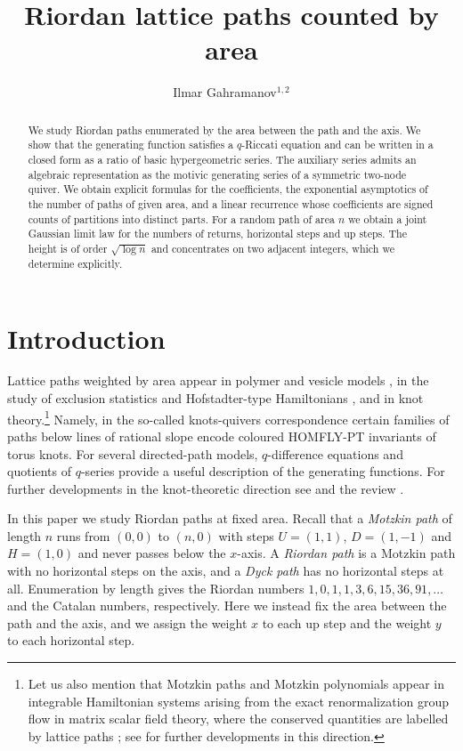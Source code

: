 \documentclass[11pt,reqno]{amsart}
\title[Riordan lattice paths counted by area]{Riordan lattice paths counted by area}
\author[Ilmar Gahramanov]{Ilmar Gahramanov$^{1,2}$}
\numberwithin{equation}{section}
\theoremstyle{remark}
\begin{document}
\begin{abstract}
We study Riordan paths enumerated by the area between the path and the axis. We show that the generating
function satisfies a $q$-Riccati equation and can be written in a closed form as a ratio
of basic hypergeometric series. The auxiliary series admits an algebraic representation as
the motivic generating series of a symmetric two-node quiver. We obtain explicit formulas
for the coefficients, the exponential asymptotics of the number of paths of given area,
and a linear recurrence whose coefficients are signed counts of partitions into distinct
parts. For a random path of area $n$ we obtain a joint Gaussian limit law for the numbers
of returns, horizontal steps and up steps. The height is of order $\sqrt{\log n}$ and
concentrates on two adjacent integers, which we determine explicitly.
\end{abstract}

\maketitle

\section{Introduction}

Lattice paths weighted by area appear in polymer and
vesicle models \cite{OP12,Poly22}, in the study of exclusion statistics and Hofstadter-type
Hamiltonians \cite{Gan25,GOP22,OP21}, and in knot
theory.\footnote{Let us also mention that Motzkin paths and Motzkin polynomials appear in
integrable Hamiltonian systems arising from the exact renormalization group flow in matrix
scalar field theory, where the conserved quantities are labelled by lattice paths
\cite{GM20}; see \cite{AM26,Mul23} for further developments in this direction.} Namely,
in the so-called knots-quivers correspondence \cite{KRSS19,PSS18,SS25} certain families of
paths below lines of rational slope encode coloured HOMFLY-PT invariants of torus knots.
For several directed-path models, $q$-difference equations and quotients of $q$-series
provide a useful description of the generating functions. For further developments in
the knot-theoretic direction see \cite{DS24,DP26,JTY24,Stosic24} and the review \cite{KN25}.

In this paper we study Riordan paths at fixed area. Recall that a \emph{Motzkin path} of
length $n$ runs from $(0,0)$ to $(n,0)$ with steps $U=(1,1)$, $D=(1,-1)$ and $H=(1,0)$
and never passes below the $x$-axis. A \emph{Riordan path} is a Motzkin path with no
horizontal steps on the axis, and a \emph{Dyck path} has no horizontal steps at all.
Enumeration by length gives the Riordan numbers $1,0,1,1,3,6,15,36,91,\dots$ and the
Catalan numbers, respectively. Here we instead fix the area between the path and the
axis, and we assign the weight $x$ to each up step and the weight $y$ to each horizontal
step.
\end{document}
